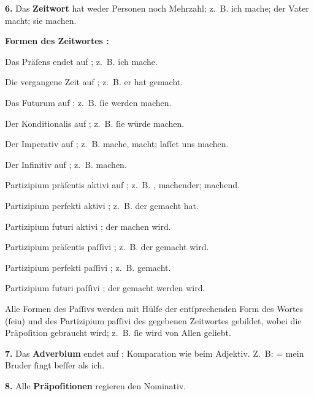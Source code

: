 {    \textbf{6.} Das \textbf{Zeitwort} hat weder Personen noch Mehrzahl; z.~B.  ich mache;  der Vater macht;  sie machen.

\begin{minipage}{\textwidth}
\begin{center}
\textbf{Formen des Zeitwortes :}
\end{center}

         Das Präſens endet auf ; z.~B.  ich mache.
\end{minipage}
        
         Die vergangene Zeit  auf ; z.~B.  er hat gemacht.
        
         Das Futurum  auf ; z.~B.  ſie werden machen.
        
         Der Konditionalis  auf ; z.~B.  ſie würde machen.
        
         Der Imperativ  auf ; z.~B.  mache, macht;  laſſet uns machen.
        
         Der Infinitiv  auf ; z.~B.  machen.
        
         Partizipium präſentis aktivi  auf ; z.~B. , machender;  machend.
        
         Partizipium perfekti aktivi  ; z.~B.  der gemacht hat.
        
         Partizipium futuri aktivi  ;  der machen wird.
        
         Partizipium präſentis paſſivi  ; z.~B.  der gemacht wird.
        
         Partizipium perfekti paſſivi  ; z.~B.  gemacht.
        
         Partizipium futuri paſſivi  ;  der gemacht werden wird.

    Alle Formen des Paſſivs werden mit Hülfe der entſprechenden Form des Wortes  (ſein) und des Partizipium paſſivi des gegebenen Zeitwortes gebildet, wobei die Präpoſition  gebraucht wird; z.~B.  ſie wird von Allen geliebt.
    
    \textbf{7.} Das \textbf{Adverbium} endet auf ; Komparation wie beim Adjektiv. Z.~B:  = mein Bruder ſingt beſſer als ich.
    
    \textbf{8.} Alle \textbf{Präpoſitionen} regieren den Nominativ.
}

